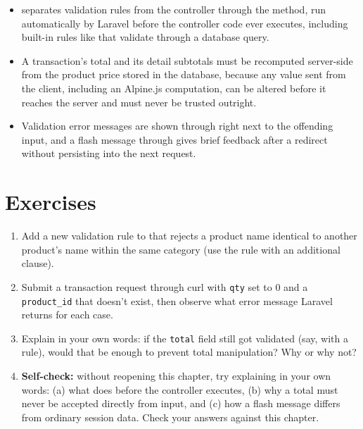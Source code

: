 \begin{itemize}
  \item {} separates validation rules from the
    controller through the  method, run automatically
    by Laravel before the controller code ever executes, including
    built-in rules like  that validate through a
    database query.
  \item A transaction's total and its detail subtotals must be
    recomputed server-side from the product price stored in the
    database, because any value sent from the client, including an
    Alpine.js computation, can be altered before it reaches the server
    and must never be trusted outright.
  \item Validation error messages are shown through 
    right next to the offending input, and a flash message through
     gives brief feedback after a redirect
    without persisting into the next request.
\end{itemize}

\section{Exercises}

\begin{enumerate}
  \item Add a new validation rule to 
    that rejects a product name identical to another product's name
    within the same category (use the  rule with an
    additional clause).
  \item Submit a transaction request through curl with \texttt{qty} set
    to 0 and a \texttt{product\_id} that doesn't exist, then observe
    what error message Laravel returns for each case.
  \item Explain in your own words: if the \texttt{total} field still
    got validated (say, with a  rule), would that be
    enough to prevent total manipulation? Why or why not?
  \item \textbf{Self-check:} without reopening this chapter, try
    explaining in your own words: (a) what  does
    before the controller executes, (b) why a total must never be
    accepted directly from input, and (c) how a flash message differs
    from ordinary session data. Check your answers against this
    chapter.
\end{enumerate}

